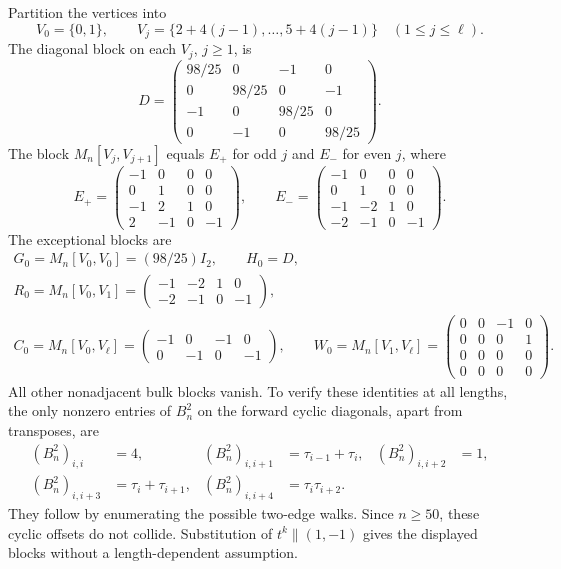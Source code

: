 Partition the vertices into
\[
 V_0=\{0,1\},\qquad
 V_j=\{2+4(j-1),\ldots,5+4(j-1)\}\quad(1\le j\le\ell).
\]
The diagonal block on each $V_j$, $j\ge1$, is
\[
 D=\begin{pmatrix}
 98/25&0&-1&0\\0&98/25&0&-1\\-1&0&98/25&0\\0&-1&0&98/25
 \end{pmatrix}.
\]
The block $M_n[V_j,V_{j+1}]$ equals $E_+$ for odd $j$ and $E_-$ for
even $j$, where
\[
 E_+=\begin{pmatrix}-1&0&0&0\\0&1&0&0\\-1&2&1&0\\2&-1&0&-1\end{pmatrix},
 \qquad
 E_-=\begin{pmatrix}-1&0&0&0\\0&1&0&0\\-1&-2&1&0\\-2&-1&0&-1\end{pmatrix}.
\]
The exceptional blocks are
\begin{gather*}
 G_0=M_n[V_0,V_0]=(98/25)I_2,\qquad H_0=D,\\
 R_0=M_n[V_0,V_1]=\begin{pmatrix}-1&-2&1&0\\-2&-1&0&-1\end{pmatrix},\\
 C_0=M_n[V_0,V_\ell]=\begin{pmatrix}-1&0&-1&0\\0&-1&0&-1\end{pmatrix},
 \qquad
 W_0=M_n[V_1,V_\ell]=\begin{pmatrix}0&0&-1&0\\0&0&0&1\\0&0&0&0\\0&0&0&0\end{pmatrix}.
\end{gather*}
All other nonadjacent bulk blocks vanish. To verify these identities at
all lengths, the only nonzero entries of $B_n^2$ on the forward cyclic
diagonals, apart from transposes, are
\begin{align*}
 (B_n^2)_{i,i}&=4,&
 (B_n^2)_{i,i+1}&=\tau_{i-1}+\tau_i,&
 (B_n^2)_{i,i+2}&=1,\\
 (B_n^2)_{i,i+3}&=\tau_i+\tau_{i+1},&
 (B_n^2)_{i,i+4}&=\tau_i\tau_{i+2}.&&
\end{align*}
They follow by enumerating the possible two-edge walks. Since $n\ge50$,
these cyclic offsets do not collide. Substitution of $t^k\|(1,-1)$ gives
the displayed blocks without a length-dependent assumption.

